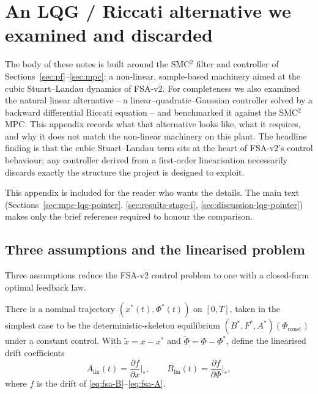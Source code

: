 \section{An LQG / Riccati alternative we examined and discarded}\label{app:lqg}

The body of these notes is built around the SMC${}^2$ filter and
controller of Sections~\ref{sec:pf}--\ref{sec:mpc}: a non-linear,
sample-based machinery aimed at the cubic Stuart--Landau dynamics of
FSA-v2. For completeness we also examined the natural linear
alternative -- a linear--quadratic--Gaussian controller solved by a
backward differential Riccati equation -- and benchmarked it against
the SMC${}^2$ MPC. This appendix records what that alternative looks
like, what it requires, and why it does not match the
non-linear machinery on this plant. The headline finding is that the
cubic Stuart--Landau term sits at the heart of FSA-v2's control
behaviour; any controller derived from a first-order linearisation
necessarily discards exactly the structure the project is designed
to exploit.

This appendix is included for the reader who wants the details. The
main text (Sections~\ref{sec:mpc-lqg-pointer},
\ref{sec:results-stage-i}, \ref{sec:discussion-lqg-pointer}) makes only
the brief reference required to honour the comparison.

\subsection{Three assumptions and the linearised problem}\label{app:lqg-A1A3}

Three assumptions reduce the FSA-v2 control problem to one with a
closed-form optimal feedback law.

\begin{assumption}\label{ass:lqg-A1}
There is a nominal trajectory $(x^*(t),\Phi^*(t))$ on $[0,T]$, taken in
the simplest case to be the deterministic-skeleton equilibrium
$(B^*,F^*,A^*)(\Phi_{\mathrm{const}})$ under a constant control. With
$\tilde x = x - x^*$ and $\tilde \Phi = \Phi - \Phi^*$, define the
linearised drift coefficients
\begin{equation}
  A_{\mathrm{lin}}(t) = \frac{\partial f}{\partial x}\bigg|_{*},
  \qquad B_{\mathrm{lin}}(t) = \frac{\partial f}{\partial \Phi}\bigg|_{*},
  \label{eq:lqg-AB}
\end{equation}
where $f$ is the drift of \eqref{eq:fsa-B}--\eqref{eq:fsa-A}.
\end{assumption}


